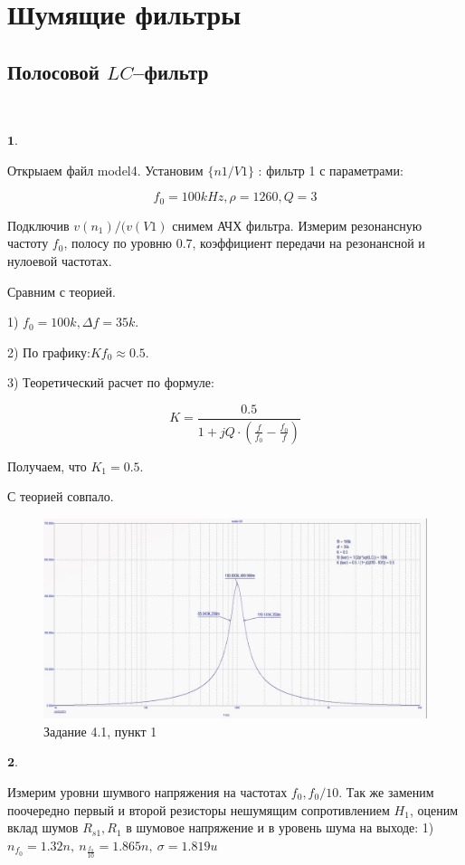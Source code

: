 \documentclass[a4paper, 14pt]{extarticle}%
\begin{document}
\newpage

\section{Шумящие фильтры}

\subsection{Полосовой $LC$--фильтр}

$ $

$\textbf{1.} $

Открыаем файл model4.
Установим $\{n1/V1\}$ : фильтр 1 с параметрами:


\[ f_0 = 100kHz, \rho = 1260, Q = 3\]


Подключив $v(n_1)/(v(V1)$ снимем АЧХ фильтра. Измерим резонансную частоту $f_0$, полосу по уровню 0.7, коэффициент передачи на резонансной и нулоевой частотах.

Сравним с теорией.

1) $f_0 = 100k, \Delta f = 35k$.

2) По графику:$K{f_0} \approx 0.5$.

3) Теоретический расчет по формуле:

\[ K = \frac{0.5}{1 + jQ\cdot(\frac{f}{f_0} - \frac{f_0}{f})}\]

Получаем, что $K_1 = 0.5$.

С теорией совпало.

\begin{figure}[h!]
			\centering
			\includegraphics[width=1.1\linewidth]{4/4_1_2.jpg}
			\caption{Задание 4.1, пункт 1}
			\label{A}
\end{figure}


$\textbf{2.} $



Измерим уровни шумвого напряжения на частотах $f_0, f_0/10$. Так же заменим поочередно первый и второй резисторы нешумящим сопротивлением $H_1$, оценим вклад шумов $R_{s1}, R_1$ в шумовое напряжение и в уровень шума на выходе:
1) $n_{f_0} = 1.32n, \: n_{\frac{f_0}{10}} = 1.865n, \: \sigma = 1.819u$
\end{document}
